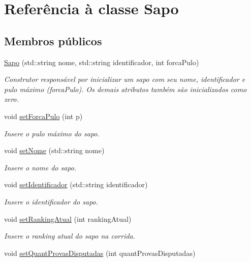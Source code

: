 \hypertarget{classSapo}{}\section{Referência à classe Sapo}
\label{classSapo}
\subsection*{Membros públicos}
\begin{DoxyCompactItemize}
\item 
\hyperlink{classSapo_a402f1c5435dd13180835b3b847e4bd7c}{Sapo} (std\+::string nome, std\+::string identificador, int forca\+Pulo)
\begin{DoxyCompactList}\small\item\em Construtor responsável por inicializar um sapo com seu nome, identificador e pulo máximo (forca\+Pulo). Os demais atributos também são inicializados como zero. \end{DoxyCompactList}\item 
void \hyperlink{classSapo_ab43f2991360d34d24f73d4cf0e7e9ea6}{set\+Forca\+Pulo} (int p)
\begin{DoxyCompactList}\small\item\em Insere o pulo máximo do sapo. \end{DoxyCompactList}\item 
void \hyperlink{classSapo_aacafe6399f877e9bda12c146531fe31f}{set\+Nome} (std\+::string nome)
\begin{DoxyCompactList}\small\item\em Insere o nome do sapo. \end{DoxyCompactList}\item 
void \hyperlink{classSapo_a617cde091fd409e66caacee5bf079e05}{set\+Identificador} (std\+::string identificador)
\begin{DoxyCompactList}\small\item\em Insere o identificador do sapo. \end{DoxyCompactList}\item 
void \hyperlink{classSapo_a6447322ddb64e1cb5588bbaea29c5181}{set\+Ranking\+Atual} (int ranking\+Atual)
\begin{DoxyCompactList}\small\item\em Insere o ranking atual do sapo na corrida. \end{DoxyCompactList}\item 
void \hyperlink{classSapo_aa6cc2e207994cbf0e1ad2239744602eb}{set\+Quant\+Provas\+Disputadas} (int quant\+Provas\+Disputadas)

\end{DoxyCompactItemize}
